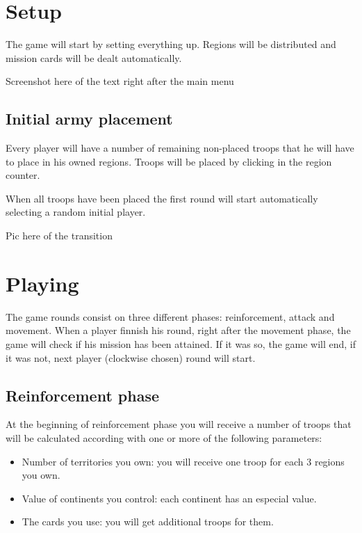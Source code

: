 \documentclass[12pt,a4paper]{article}
\begin{document}
\section{Setup}
The game will start by setting everything up. Regions will be distributed and mission cards will be dealt automatically.

\begin{todo}[Alberto]
  Screenshot here of the text right after the main menu
\end{todo}

\subsection{Initial army placement}
Every player will have a number of remaining non-placed troops that he will have to place in his owned regions. Troops will be placed by clicking in the region counter. 

When all troops have been placed the first round will start automatically selecting a random initial player.

\begin{todo}[Alberto]
  Pic here of the transition 
\end{todo}

\section{Playing}
The game rounds consist on three different phases: reinforcement, attack and movement. When a player finnish his round, right after the movement phase, the game will check if his mission has been attained. If it was so, the game will end, if it was not, next player (clockwise chosen) round will start.

\subsection{Reinforcement phase}
At the beginning of reinforcement phase you will receive a number of troops that will be calculated according with one or more of the following parameters:

\begin{itemize}
\item Number of territories you own: you will receive one troop for each 3 regions you own. 
\item Value of continents you control: each continent has an especial value.
\item The cards you use: you will get additional troops for them.
\end{itemize}
\end{document}
